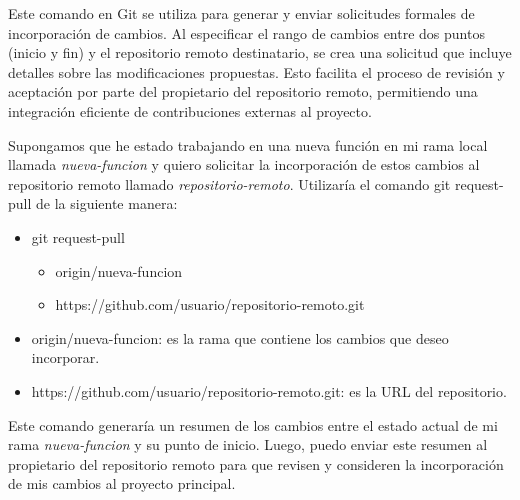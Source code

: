 
Este comando en Git se utiliza para generar y enviar solicitudes formales de incorporación
de cambios. Al especificar el rango de cambios entre dos puntos (inicio y fin) y el repositorio
remoto destinatario, se crea una solicitud que incluye detalles sobre las modificaciones
propuestas. Esto facilita el proceso de revisión y aceptación por parte del propietario del
repositorio remoto, permitiendo una integración eficiente de contribuciones externas al proyecto.

Supongamos que he estado trabajando en una nueva función en mi rama local llamada \textit{nueva-funcion}
y quiero solicitar la incorporación de estos cambios al repositorio remoto llamado \textit{repositorio-remoto}.
Utilizaría el comando git request-pull de la siguiente manera:


\begin{itemize}
    \item[] git request-pull
    \begin{itemize}
        \item[] origin/nueva-funcion
        \item[] https://github.com/usuario/repositorio-remoto.git
    \end{itemize}
\end{itemize}
  

\begin{itemize}
    \item[] origin/nueva-funcion: es la rama que contiene los cambios que deseo incorporar.
    \item[] https://github.com/usuario/repositorio-remoto.git: es la URL del repositorio.
\end{itemize}


Este comando generaría un resumen de los cambios entre el estado actual de mi rama \textit{nueva-funcion}
y su punto de inicio. Luego, puedo enviar este resumen al propietario del repositorio remoto para
que revisen y consideren la incorporación de mis cambios al proyecto principal.




